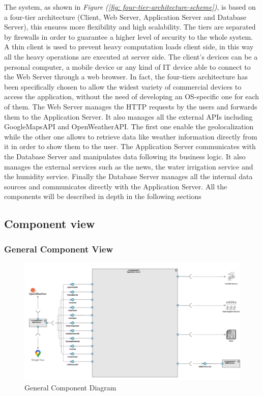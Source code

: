 \documentclass[table, 12pt]{article}
\begin{document}
The system, as shown in \textit{Figure (\ref{fig: four-tier-architecture-scheme})}, is based on a four-tier architecture (Client, Web Server, Application Server and Database Server), this ensures more flexibility and high scalability.
The tiers are separated by firewalls in order to guarantee a higher level of security to the whole system.
A thin client is used to prevent heavy computation loads client side, in this way all the heavy operations are executed at server side.
The client's devices can be a personal computer, a mobile device or any kind of IT device able to connect to the Web Server through a web browser. In fact, the four-tiers architecture has been specifically chosen to allow the widest variety of commercial devices to access the application, without the need of developing an OS-specific one for each of them.
The Web Server manages the HTTP requests by the users and forwards them to the Application Server.
It also manages all the external APIs including GoogleMapsAPI and OpenWeatherAPI.
The first one enable the geolocalization while the other one allows to retrieve data like weather information directly from it in order to show them to the user.
The Application Server communicates with the Database Server and manipulates data following its business logic.
It also manages the external services such as the news, the water irrigation service and the humidity service.
Finally the Database Server manages all the internal data sources and communicates directly with the Application Server.
All the components will be described in depth in the following sections

\subsection{Component view}
\subsubsection*{General Component View}
\begin{center}
    \begin{figure}[H]
        \includegraphics[scale=0.45, center]{assets/general-component-view.png}
        \caption{General Component Diagram}
        \label{fig: general_component_view}
    \end{figure}
\end{center}
\end{document}
